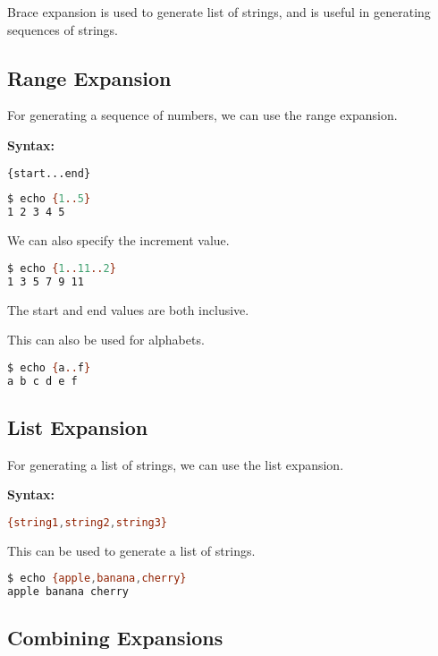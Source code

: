 Brace expansion is used to generate list of strings, and is useful in generating sequences of strings.

\subsection{Range Expansion}

For generating a sequence of numbers, we can use the range expansion.

\textbf{Syntax:}
\begin{lstlisting}[language=bash]
{start...end}
\end{lstlisting}

\begin{lstlisting}[language=bash]
$ echo {1..5}
1 2 3 4 5
\end{lstlisting}

We can also specify the increment value.

\begin{lstlisting}[language=bash]
$ echo {1..11..2}
1 3 5 7 9 11
\end{lstlisting}

The start and end values are both inclusive.

This can also be used for alphabets.

\begin{lstlisting}[language=bash]
$ echo {a..f}
a b c d e f
\end{lstlisting}

\subsection{List Expansion}

For generating a list of strings, we can use the list expansion.

\textbf{Syntax:}
\begin{lstlisting}[language=bash]
{string1,string2,string3}
\end{lstlisting}

This can be used to generate a list of strings.

\begin{lstlisting}[language=bash]
$ echo {apple,banana,cherry}
apple banana cherry
\end{lstlisting}

\subsection{Combining Expansions}


